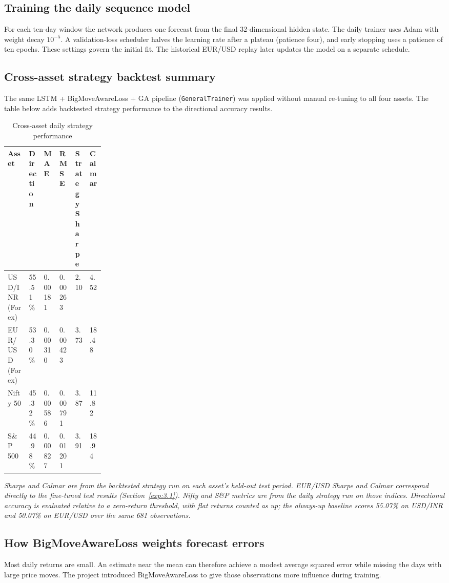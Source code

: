 \documentclass[12pt,a4paper,twoside,openany]{report}
\begin{document}
\subsection*{Training the daily sequence model}
For each ten-day window the network produces one forecast from the final 32-dimensional hidden state. The daily trainer uses Adam with weight decay $10^{-5}$. A validation-loss scheduler halves the learning rate after a plateau (patience four), and early stopping uses a patience of ten epochs. These settings govern the initial fit. The historical EUR/USD replay later updates the model on a separate schedule.

\subsection*{Cross-asset strategy backtest summary}
The same LSTM + BigMoveAwareLoss + GA pipeline (\texttt{GeneralTrainer}) was applied without manual re-tuning to all four assets. The table below adds backtested strategy performance to the directional accuracy results.
\begin{table}[htbp]\centering\singlespacing
\caption{Cross-asset daily strategy performance}
\begin{tabularx}{\linewidth}{@{}p{0.22\linewidth}XXXXX@{}}
\toprule
Asset & Direction & MAE & RMSE & Strategy Sharpe & Calmar\\\midrule
USD/INR (Forex) & 55.51\% & 0.00181 & 0.00263 & 2.10 & 4.52\\
EUR/USD (Forex) & 53.30\% & 0.00310 & 0.00423 & 3.73 & 18.48\\
Nifty 50 & 45.32\% & 0.00586 & 0.00791 & 3.87 & 11.82\\
S\&P 500 & 44.98\% & 0.00827 & 0.01201 & 3.91 & 18.94\\
\bottomrule
\end{tabularx}
\end{table}
{\small\itshape Sharpe and Calmar are from the backtested strategy run on each asset's held-out test period. EUR/USD Sharpe and Calmar correspond directly to the fine-tuned test results (Section~\ref{exp:3.1}). Nifty and S\&P metrics are from the daily strategy run on those indices. Directional accuracy is evaluated relative to a zero-return threshold, with flat returns counted as up; the always-up baseline scores 55.07\% on USD/INR and 50.07\% on EUR/USD over the same 681 observations.}\par

\subsection{How BigMoveAwareLoss weights forecast errors}\label{exp:2.1}
Most daily returns are small. An estimate near the mean can therefore achieve a modest average squared error while missing the days with large price moves. The project introduced BigMoveAwareLoss to give those observations more influence during training.\par
\end{document}
